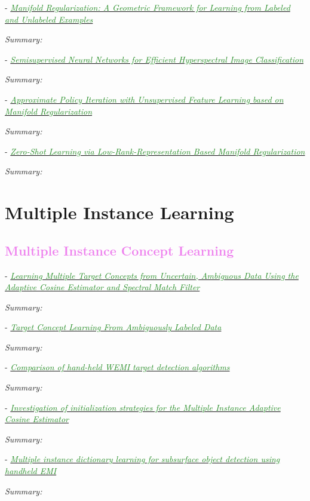 \documentclass[]{article}
\newcommand{\paperentry}[4]{
            \hangindent=1cm
            \textcolor{red}{\cite{#1}} - \href{run:../References/#3}{\textcolor{ForestGreen}{\textit{#2}}}
            
            \noindent            
            \begin{minipage}[t]{0.1\linewidth}\hfill\end{minipage}
            \begin{minipage}[t]{0.8\linewidth}\textcolor{NavyBlue}{{\textit{Summary:}}}#4\end{minipage}
            \vspace{.25cm}
          }
\begin{document}
	\paperentry{Belkin2006ManReg}
	{Manifold Regularization: A Geometric Framework for Learning from Labeled and Unlabeled Examples}
	{Manifold_Representation_Learning/ManifoldRegularization/Belkin2006ManReg.pdf}
	{}
	
	\paperentry{Ratle2010ManRegHSI}
	{Semisupervised Neural Networks for Efficient Hyperspectral Image Classification}
	{Manifold_Representation_Learning/ManifoldRegularization/Ratle2010ManRegHSI.pdf}
	{}
	
	\paperentry{Li2015ManRegReinforcementLearning}
	{Approximate Policy Iteration with Unsupervised Feature Learning based on Manifold Regularization}
	{Manifold_Representation_Learning/ManifoldRegularization/Li2015ManRegReinforcementLearning.pdf}
	{}
	
	\paperentry{Meng2018ManRegZeroShot}
	{Zero-Shot Learning via Low-Rank-Representation Based Manifold Regularization}
	{Manifold_Representation_Learning/ManifoldRegularization/Meng2018ManRegZeroShot.pdf}
	{}
	
\section{Multiple Instance Learning}

	\textcolor{Violet}{\subsection{Multiple Instance Concept Learning}}
	
		\paperentry{Bocinsky2019Thesis}
		{Learning Multiple Target Concepts from Uncertain, Ambiguous Data Using the Adaptive Cosine Estimator and Spectral Match Filter}
		{Multiple_Instance_Learning/Bocinsky2019Thesis.pdf}
		{}
		
		\paperentry{Jiao2017Thesis}
		{Target Concept Learning From Ambiguously Labeled Data}
		{Multiple_Instance_Learning/Jiao2017MIHE_Thesis.pdf}
		{}
		
		\paperentry{Mccurley2019SPIEWEMIComparison}
		{Comparison of hand-held WEMI target detection algorithms}
		{Multiple_Instance_Learning/Mccurley2019SPIEWEMIComparison.pdf}
		{}
		
		\paperentry{Bocinsky2019SPIEMIACEInitialization}
		{Investigation of initialization strategies for the Multiple Instance Adaptive Cosine Estimator}
		{Multiple_Instance_Learning/Bocinsky2019SPIEMIACEInitialization.pdf}
		{}
		
		\paperentry{Zare2015MILLandmineEMI}
		{Multiple instance dictionary learning for subsurface object detection using handheld EMI}
		{Multiple_Instance_Learning/Zare2015MILLandmineEMI.pdf}
		{}
		
\end{document}
